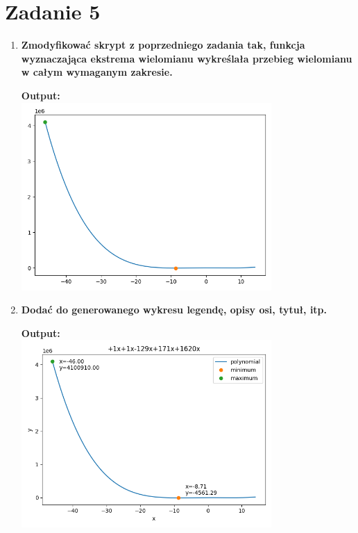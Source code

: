 \documentclass[12pt]{article}
\newenvironment{shbox}
{\begin{tcolorbox}[enhanced, boxrule=0pt, drop fuzzy shadow southeast]}
{\end{tcolorbox}}
\begin{document}
    \section{Zadanie 5}
        \begin{enumerate}
            \item\textbf{Zmodyfikować skrypt z poprzedniego zadania tak,
                funkcja wyznaczająca ekstrema wielomianu wykreślała
                przebieg wielomianu w całym wymaganym zakresie. }
                \begin{shbox}
                    \centering
                    \textbf{Output:} \\
                    \includegraphics[width=0.75\textwidth]{zad5_1.png}
                \end{shbox}

            \item\textbf{Dodać do generowanego wykresu legendę, opisy osi, tytuł, itp.}
                \begin{shbox}
                    \centering
                    \textbf{Output:} \\
                    \includegraphics[width=0.75\textwidth]{zad5_2.png}
                \end{shbox}
        \end{enumerate}
\end{document}
